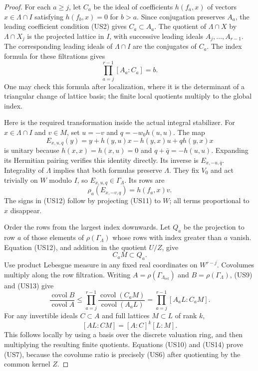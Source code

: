 \begin{proof}
For each $a\geq j$, let $C_a$ be the ideal of coefficients
$h(f_a,x)$ of vectors $x\in\Lambda\cap I$ satisfying
$h(f_b,x)=0$ for $b>a$.  Since conjugation preserves $A_a$,
the leading coefficient condition (US2) gives $C_a\subset A_a$.
The quotient of $\Lambda\cap X$ by $\Lambda\cap X_j$ is
the projected lattice in $I$, with successive leading
ideals $A_j,\ldots,A_{r-1}$.  The corresponding leading
ideals of $\Lambda\cap I$ are the conjugates of $C_a$.
The index formula for these filtrations gives
\[
                     \prod_{a=j}^{r-1}[A_a:C_a]=b.
 \tag{US10}
\]
One may check this formula after localization, where it is
the determinant of a triangular change of lattice basis;
the finite local quotients multiply to the global index.

Here is the required transformation inside the actual
integral stabilizer.  For $x\in\Lambda\cap I$ and
$v\in M$, set $u=-v$ and $q=-w_0h(u,u)$.  The map
\[
 E_{x,u,q}(y)=y+h(y,u)x-h(y,x)u+q h(y,x)x
 \tag{US11}
\]
is unitary because $h(x,x)=h(x,u)=0$ and
$q+\bar q=-h(u,u)$.  Expanding its Hermitian pairing
verifies this identity directly.  Its inverse is
$E_{x,-u,\bar q}$.  Integrality of $\Lambda$ implies
that both formulas preserve $\Lambda$.
They fix $V_0$ and act trivially on $W$ modulo $I$, so
$E_{x,u,q}\in\Gamma_\Lambda$.  Its rows are
\[
                     \rho_a(E_{x,-v,q})=h(f_a,x)v.
 \tag{US12}
\]
The signs in (US12) follow by projecting (US11) to $W$;
all terms proportional to $x$ disappear.

Order the rows from the largest index downwards.  Let $Q_a$
be the projection to row $a$ of those elements of
$\rho(\Gamma_\Lambda)$ whose rows with index greater than
$a$ vanish.  Equation (US12), and addition in the quotient
$U/Z$, give
\[
                              C_aM\subset Q_a.
 \tag{US13}
\]
Use product Lebesgue measure in any fixed real coordinates
on $W^{r-j}$.  Covolumes multiply along the row filtration.
Writing $A=\rho(\Gamma_{\Lambda_{\mathrm{ref}}})$ and
$B=\rho(\Gamma_\Lambda)$, (US9) and (US13) give
\[
 \frac{\operatorname{covol}B}{\operatorname{covol}A}
 \leq\prod_{a=j}^{r-1}
             \frac{\operatorname{covol}(C_aM)}
                  {\operatorname{covol}(A_aL)}
 =\prod_{a=j}^{r-1}[A_aL:C_aM].
\]
For any invertible ideals $C\subset A$ and full lattices
$M\subset L$ of rank $k$,
\[
                       [AL:CM]=[A:C]^k[L:M].
 \tag{US14}
\]
This follows locally by using a basis over the discrete
valuation ring, and then multiplying the resulting finite
quotients.  Equations (US10) and (US14) prove (US7), because
the covolume ratio is precisely (US6) after quotienting by
the common kernel $Z$.


\end{proof}

